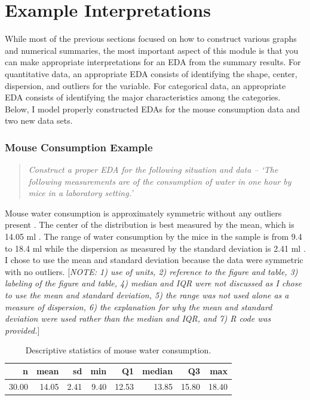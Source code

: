 \documentclass[10pt,openany]{book}\usepackage[]{graphicx}\usepackage[]{color}
\begin{document}
\section{Example Interpretations}
\vspace{-12pt}
While most of the previous sections focused on how to construct various graphs and numerical summaries, the most important aspect of this module is that you can make appropriate interpretations for an EDA from the summary results.  For quantitative data, an appropriate EDA consists of identifying the shape, center, dispersion, and outliers for the variable.  For categorical data, an appropriate EDA consists of identifying the major characteristics among the categories.  Below, I model properly constructed EDAs for the mouse consumption data and two new data sets.

\subsubsection{Mouse Consumption Example}
\vspace{-12pt}
\begin{quote}
\textit{Construct a proper EDA for the following situation and data -- `The  following measurements  are of the consumption of water in one hour by mice in a laboratory setting.'}
\end{quote}
\vspace{-12pt}


Mouse water consumption is approximately symmetric without any outliers present .  The center of the distribution is best measured by the mean, which is 14.05 ml .  The range of water consumption by the mice in the sample is from 9.4 to 18.4 ml while the dispersion as measured by the standard deviation is 2.41 ml .  I chose to use the mean and standard deviation because the data were symmetric with no outliers.  [\textit{NOTE: 1) use of units, 2) reference to the figure and table, 3) labeling of the figure and table, 4) median and IQR were not discussed as I chose to use the mean and standard deviation, 5) the range was not used alone as a measure of dispersion, 6) the explanation for why the mean and standard deviation were used rather than the median and IQR, and 7) R code was provided.}]

\begin{table}[ht]
\centering
\caption{Descriptive statistics of mouse water consumption.} 
\label{tab:MouseStats}
\begin{tabular}{rrrrrrrr}
  \hline
n & mean & sd & min & Q1 & median & Q3 & max \\ 
  \hline
30.00 & 14.05 & 2.41 & 9.40 & 12.53 & 13.85 & 15.80 & 18.40 \\ 
   \hline
\end{tabular}
\end{table}
\end{document}
